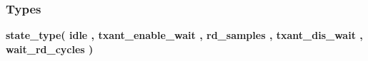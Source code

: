 \subsubsection*{Types}
 \begin{DoxyCompactItemize}
\item 
{\bfseries {\bf state\+\_\+type}{\bfseries \textcolor{vhdlchar}{(}\textcolor{vhdlchar}{ }\textcolor{vhdlchar}{idle}\textcolor{vhdlchar}{ }\textcolor{vhdlchar}{,}\textcolor{vhdlchar}{ }\textcolor{vhdlchar}{txant\+\_\+enable\+\_\+wait}\textcolor{vhdlchar}{ }\textcolor{vhdlchar}{,}\textcolor{vhdlchar}{ }\textcolor{vhdlchar}{rd\+\_\+samples}\textcolor{vhdlchar}{ }\textcolor{vhdlchar}{,}\textcolor{vhdlchar}{ }\textcolor{vhdlchar}{txant\+\_\+dis\+\_\+wait}\textcolor{vhdlchar}{ }\textcolor{vhdlchar}{,}\textcolor{vhdlchar}{ }\textcolor{vhdlchar}{wait\+\_\+rd\+\_\+cycles}\textcolor{vhdlchar}{ }\textcolor{vhdlchar}{)}\textcolor{vhdlchar}{ }}} 
\end{DoxyCompactItemize}
